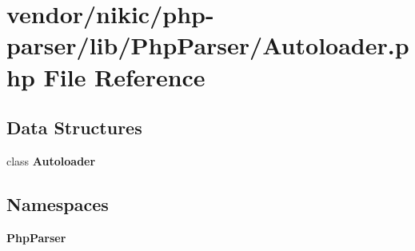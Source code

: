 \section{vendor/nikic/php-\/parser/lib/\+Php\+Parser/\+Autoloader.php File Reference}
\label{nikic_2php-parser_2lib_2_php_parser_2_autoloader_8php}
\subsection*{Data Structures}
\begin{DoxyCompactItemize}
\item 
class {\bf Autoloader}
\end{DoxyCompactItemize}
\subsection*{Namespaces}
\begin{DoxyCompactItemize}
\item 
 {\bf Php\+Parser}
\end{DoxyCompactItemize}
